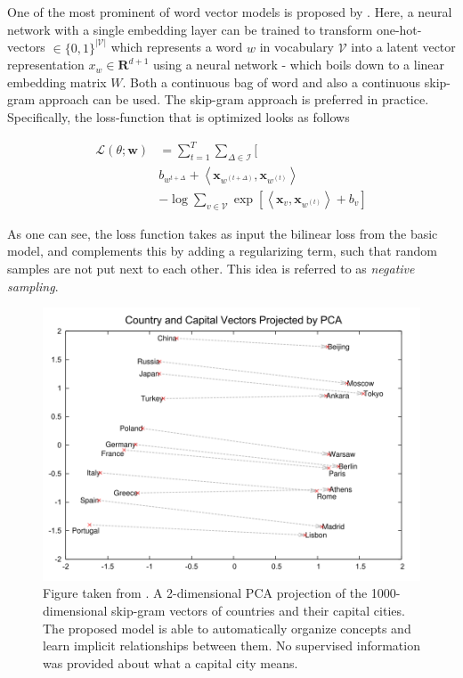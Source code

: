\documentclass[a4paper,12pt,oneside,openright]{report}
\begin{document}
One of the most prominent of word vector models is proposed by \cite{mikolov13, mikolov13b}.
Here, a neural network with a single embedding layer can be trained to transform one-hot-vectors $\in \{ 0, 1 \}^{| \mathcal{V} |}$ which represents a word $w$ in vocabulary $\mathcal{V}$
into a latent vector representation $x_w \in \mathbf{R}^{d + 1}$ using a neural network - which boils down to a linear embedding matrix $W$.
Both a continuous bag of word and also a continuous skip-gram approach can be used.
The skip-gram approach is preferred in practice.
Specifically, the loss-function that is optimized looks as follows

\begin{align} 
\mathcal{L}(\theta ; \mathbf{w}) & =\sum_{t=1}^{T} \sum_{\Delta \in \mathcal{I}} [\\ 
& b_{w^{t+\Delta}} +\left\langle \mathbf{x}_{w^{(t+\Delta)}}, \mathbf{x}_{w^{(t)}} \right\rangle \\
& -\log \sum_{v \in \mathcal{V}} \exp \left[\left\langle\mathbf{x}_{v}, \mathbf{x}_{w^{(t)}}\right\rangle+b_{v} \right] 
\end{align}

As one can see, the loss function takes as input the bilinear loss from the basic model, and complements this by adding a regularizing term, such that random samples are not put next to each other.
This idea is referred to as \textit{negative sampling}.

\begin{figure}[h]
	\center
  \includegraphics[width=0.6\linewidth]{./assets/background/word2vec_cities.png}
  \caption{Figure taken from \cite{mikolov13b}. A 2-dimensional PCA projection of the 1000-dimensional skip-gram vectors of countries and their capital cities. The proposed model is able to automatically organize concepts and learn implicit relationships between them. No supervised information was provided about what a capital city means.}
  \label{fig:cbow_skipgram}
\end{figure}
\end{document}
